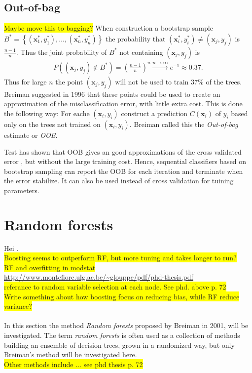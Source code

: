 \subsection{Out-of-bag}
\label{sub:Out-of-bag}
\colorbox{yellow}{Maybe move this to bagging?}
When construction a bootstrap sample $B^* = \left\{ (\mathbf{x}_1^*, y_1^*), \ldots, (\mathbf{x}_n^*, y_n^*) \right\}$ the probability that $(\mathbf{x}_i^*, y_i^*) \neq (\mathbf{x}_j, y_j)$ is $\frac{n-1}{n}$. Thus the joint probability of $B^*$ not containing $(\mathbf{x}_j, y_j)$ is 
\begin{align}
  P\left(  (\mathbf{x}_j, y_j) \notin B^*\right) = \left( \frac{n-1}{n}  \right)^n 
  \xrightarrow{n \rightarrow \infty} e^{-1} \approx 0.37. 
\end{align}
Thus for large $n$ the point $(\mathbf{x}_j, y_j)$ will not be used to train $37 \%$ of the trees. Breiman suggested in 1996 \cite{outOfBag} that these points could be used to create an approximation of the misclassification error, with little extra cost. This is done the following way: For eache $(\mathbf{x}_i, y_i)$ construct a prediction $C(\mathbf{x}_i)$ of $y_i$ based only on the trees not trained on $(\mathbf{x}_i, y_i)$. Breiman called this the \textit{Out-of-bag} estimate or \textit{OOB}. 

Test has shown that OOB gives an good approximations of the cross validated error \cite{outOfBag}, but without the large training cost. 
Hence, sequential classifiers based on bootstrap sampling can report the OOB for each iteration and terminate when the error stabilize. It can also be used instead of cross validation for tuining parameters.








\section{Random forests}
\label{sec:Random forests}
Hei \cite{randomforests}.
\\ \colorbox{yellow}{Boosting seems to outperform RF, but more tuning and takes longer to run?} \\
\colorbox{yellow}{RF and overfitting in modstat}\\
\url{http://www.montefiore.ulg.ac.be/~glouppe/pdf/phd-thesis.pdf} \\
\colorbox{yellow}{referance to random variable selection at each node. See phd. above p. 72} \\
\colorbox{yellow}{Write something about how boosting focus on reducing bias, while RF reduce variance?} \\
\\
In this section the method \textit{Random forests} proposed by Breiman \cite{randomforests} in 2001, will be investigated. The term \textit{random forests} is often used as a collection of methods building an ensemble of decision trees, grown in a randomized way, but only Breiman's method will be investigated here. 
\\\colorbox{yellow}{Other methods include ... see phd thesis p. 72}

